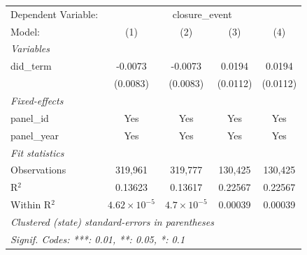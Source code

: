 
\begingroup
\centering
\begin{tabular}{lcccc}
   \tabularnewline \midrule \midrule
   Dependent Variable: & \multicolumn{4}{c}{closure\_event}\\
   Model:       & (1)                   & (2)                  & (3)      & (4)\\  
   \midrule
   \emph{Variables}\\
   did\_term    & -0.0073               & -0.0073              & 0.0194   & 0.0194\\   
                & (0.0083)              & (0.0083)             & (0.0112) & (0.0112)\\   
   \midrule
   \emph{Fixed-effects}\\
   panel\_id    & Yes                   & Yes                  & Yes      & Yes\\  
   panel\_year  & Yes                   & Yes                  & Yes      & Yes\\  
   \midrule
   \emph{Fit statistics}\\
   Observations & 319,961               & 319,777              & 130,425  & 130,425\\  
   R$^2$        & 0.13623               & 0.13617              & 0.22567  & 0.22567\\  
   Within R$^2$ & $4.62\times 10^{-5}$  & $4.7\times 10^{-5}$  & 0.00039  & 0.00039\\  
   \midrule \midrule
   \multicolumn{5}{l}{\emph{Clustered (state) standard-errors in parentheses}}\\
   \multicolumn{5}{l}{\emph{Signif. Codes: ***: 0.01, **: 0.05, *: 0.1}}\\
\end{tabular}
\par\endgroup


